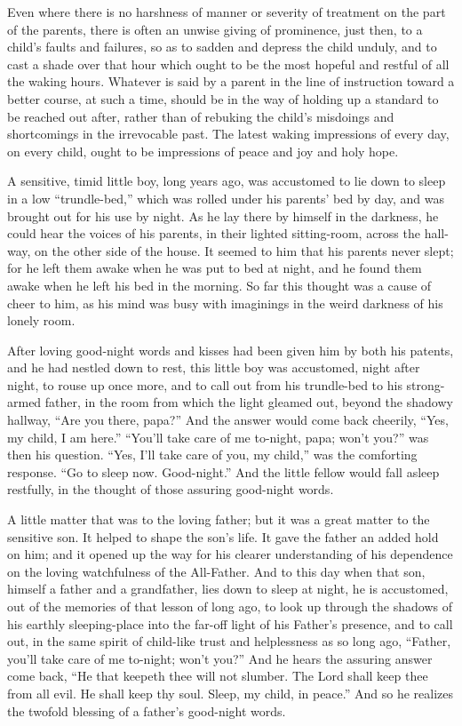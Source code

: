 \documentclass[
]{book}
\begin{document}
Even where there is no harshness of manner or severity of treatment on the part of the parents, there is often an unwise giving of prominence, just then, to a child's faults and failures, so as to sadden and depress the child unduly, and to cast a shade over that hour which ought to be the most hopeful and restful of all the waking hours. Whatever is said by a parent in the line of instruction toward a better course, at such a time, should be in the way of holding up a standard to be reached out after, rather than of rebuking the child's misdoings and shortcomings in the irrevocable past. The latest waking impressions of every day, on every child, ought to be impressions of peace and joy and holy hope.

A sensitive, timid little boy, long years ago, was accustomed to lie down to sleep in a low ``trundle-bed,'' which was rolled under his parents' bed by day, and was brought out for his use by night. As he lay there by himself in the darkness, he could hear the voices of his parents, in their lighted sitting-room, across the hall-way, on the other side of the house. It seemed to him that his parents never slept; for he left them awake when he was put to bed at night, and he found them awake when he left his bed in the morning. So far this thought was a cause of cheer to him, as his mind was busy with imaginings in the weird darkness of his lonely room.

After loving good-night words and kisses had been given him by both his patents, and he had nestled down to rest, this little boy was accustomed, night after night, to rouse up once more, and to call out from his trundle-bed to his strong-armed father, in the room from which the light gleamed out, beyond the shadowy hallway, ``Are you there, papa?'' And the answer would come back cheerily, ``Yes, my child, I am here.'' ``You'll take care of me to-night, papa; won't you?'' was then his question. ``Yes, I'll take care of you, my child,'' was the comforting response. ``Go to sleep now. Good-night.'' And the little fellow would fall asleep restfully, in the thought of those assuring good-night words.

A little matter that was to the loving father; but it was a great matter to the sensitive son. It helped to shape the son's life. It gave the father an added hold on him; and it opened up the way for his clearer understanding of his dependence on the loving watchfulness of the All-Father. And to this day when that son, himself a father and a grandfather, lies down to sleep at night, he is accustomed, out of the memories of that lesson of long ago, to look up through the shadows of his earthly sleeping-place into the far-off light of his Father's presence, and to call out, in the same spirit of child-like trust and helplessness as so long ago, ``Father, you'll take care of me to-night; won't you?'' And he hears the assuring answer come back, ``He that keepeth thee will not slumber. The Lord shall keep thee from all evil. He shall keep thy soul. Sleep, my child, in peace.'' And so he realizes the twofold blessing of a father's good-night words.
\end{document}
